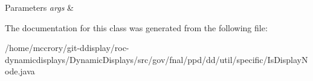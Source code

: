 \begin{DoxyParams}{Parameters}
{\em args} & \\
\hline
\end{DoxyParams}


The documentation for this class was generated from the following file\-:\begin{DoxyCompactItemize}
\item 
/home/mccrory/git-\/ddisplay/roc-\/dynamicdisplays/\-Dynamic\-Displays/src/gov/fnal/ppd/dd/util/specific/Is\-Display\-Node.\-java\end{DoxyCompactItemize}
